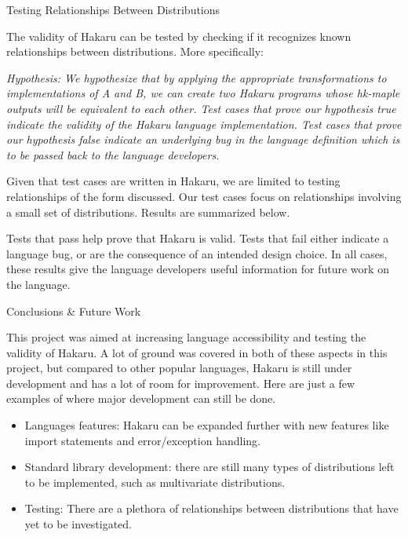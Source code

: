 \documentclass[22pt]{beamer}
\begin{document}
\begin{frame}[fragile]
\begin{textblock}{5}
\begin{block}{\Large{Testing Relationships Between Distributions}}
\justifying


\footnotesize{The validity of Hakaru can be tested by checking if it recognizes known relationships between distributions. More specifically:

\bigskip


\begin{addmargin}[4em]{4em}
\textit{Hypothesis: We hypothesize that by applying the appropriate transformations to implementations of A and B, we can create two Hakaru programs whose hk-maple outputs will be equivalent to each other. Test cases that prove our hypothesis true indicate the validity of the Hakaru language implementation. Test cases that prove our hypothesis false indicate an underlying bug in the language definition which is to be passed back to the language developers.}
\end{addmargin}

\bigskip
Given that test cases are written in Hakaru, we are limited to testing relationships of the form discussed. Our test cases focus on relationships involving a small set of distributions. Results are summarized below.

\bigskip
Tests that pass help prove that Hakaru is valid. Tests that fail either indicate a language bug, or are the consequence of an intended design choice. In all cases, these results give the language developers useful information for future work on the language.
}

\end{block}


\begin{block}{\Large{Conclusions \& Future Work}}

\footnotesize{This project was aimed at increasing language accessibility and testing the validity of Hakaru. A lot of ground was covered in both of these aspects in this project, but compared to other popular languages, Hakaru is still under development and has a lot of room for improvement. Here are just a few examples of where major development can still be done.

\begin{itemize}
    \item Languages features: Hakaru can be expanded further with new features like import statements and error/exception handling. 
    \item Standard library development: there are still many types of  distributions left to be implemented, such as multivariate distributions.
    \item Testing: There are a plethora of relationships between distributions that have yet to be investigated.  
\end{itemize}

}
\end{block}
\end{textblock}
\end{frame}
\end{document}
